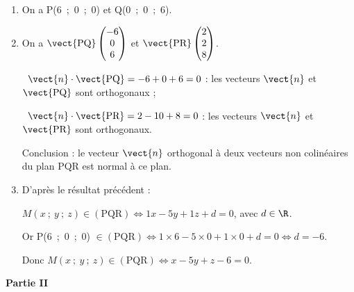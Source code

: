 \begin{enumerate}
\item %

On a P(6~;~0~;~0) et Q(0~;~0~;~6).
\item %
On a $\vect{\text{PQ}}\begin{pmatrix}-6\\0\\6\end{pmatrix}$ et $\vect{\text{PR}}\begin{pmatrix}2\\2\\8\end{pmatrix}$.

\starredbullet~$\vect{n} \cdot \vect{\text{PQ}} = - 6  + 0 + 6 = 0$ : les vecteurs $\vect{n}$ et $\vect{\text{PQ}}$ sont orthogonaux ;


\starredbullet~$\vect{n} \cdot \vect{\text{PR}} = 2 - 10 + 8 = 0$ : les vecteurs $\vect{n}$ et $\vect{\text{PR}}$ sont orthogonaux.

Conclusion : le vecteur $\vect{n}$ orthogonal à deux vecteurs non colinéaires du plan PQR est normal à ce plan.
\item %
D'après le résultat précédent :

$M(x~;~y~;~z) \in (\text{PQR}) \iff 1x - 5y + 1z  + d = 0$, avec $d \in \R$.

Or P(6~;~0~;~0) $ \in (\text{PQR}) \iff 1\times 6  - 5\times 0  + 1\times 0  + d = 0 \iff d = - 6$.

Donc $M(x~;~y~;~z) \in (\text{PQR}) \iff x - 5y + z  - 6 = 0$.
\end{enumerate}

\bigskip

\textbf{Partie II}

\medskip

%


